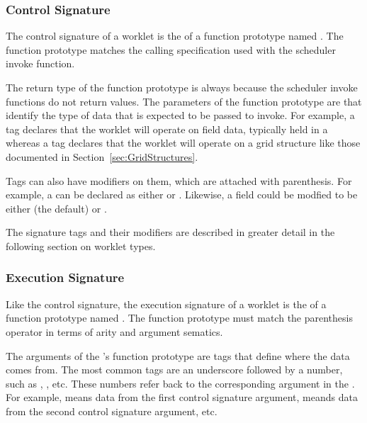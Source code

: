 \subsubsection{Control Signature}


The control signature of a worklet is the  of a function
prototype named \controlsignature. The function prototype matches the
calling specification used with the scheduler invoke function.

The return type of the function prototype is always  because
the scheduler invoke functions do not return values. The parameters of the
function prototype are  that identify
the type of data that is expected to be passed to invoke. For example, a
 tag declares that the worklet will operate on field data,
typically held in a  whereas a  tag
declares that the worklet will operate on a grid structure like those
documented in Section~\ref{sec:GridStructures}.

Tags can also have modifiers on them, which are attached with
parenthesis. For example, a  can be declared as either
 or . Likewise, a field
could be modfied to be either  (the default) or
. 

The signature tags and their modifiers are described in greater detail in
the following section on worklet types.


\subsubsection{Execution Signature}


Like the control signature, the execution signature of a worklet is the
 of a function prototype named \executionsignature. The
function prototype must match the parenthesis operator in terms of arity
and argument sematics.

The arguments of the \executionsignature's function prototype are tags that
define where the data comes from. The most common tags are an underscore
followed by a number, such as , , etc. These
numbers refer back to the corresponding argument in the
\controlsignature. For example,  means data from the first
control signature argument,  meands data from the second
control signature argument, etc.

